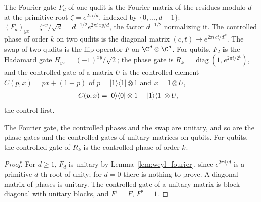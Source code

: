 \begin{definition}[Gates]
    \label{def:qft_gates}
    \leanok
    The Fourier gate $F_d$ of one qudit is the Fourier matrix of the residues modulo $d$ at
    the primitive root $\zeta=e^{2\pi i/d}$, indexed by $\{0,\dots,d-1\}$:
    $(F_d)_{yx}=\zeta^{xy}/\sqrt d=d^{-1/2}e^{2\pi i\,xy/d}$, the factor $d^{-1/2}$
    normalizing it. The controlled phase of order $k$ on two qudits is the diagonal
    matrix $(c,t)\mapsto e^{2\pi i\,ct/d^k}$. The swap of two qudits is the flip operator $F$
    on $\C^d\otimes\C^d$. For qubits, $F_2$ is the Hadamard gate
    $H_{yx}=(-1)^{xy}/\sqrt2$; the phase gate is
    $R_k=\operatorname{diag}(1,e^{2\pi i/2^k})$, and the controlled gate of a matrix $U$
    is the controlled element $C(p,x)=px+(1-p)$ of $p=\lvert1\rangle\langle1\rvert\otimes1$
    and $x=1\otimes U$,
    \begin{align}
        C(p,x)&=\lvert0\rangle\langle0\rvert\otimes1+\lvert1\rangle\langle1\rvert\otimes U,
        \notag
    \end{align}
    the control first.
\end{definition}

\begin{lemma}
    \label{lem:qft_gates_unitary}
    \leanok
    The Fourier gate, the controlled phases and the swap are unitary, and so are the
    phase gates and the controlled gates of unitary matrices on qubits. For qubits, the
    controlled gate of $R_k$ is the controlled phase of order $k$.
\end{lemma}
\begin{proof}\leanok
    For $d\geq1$, $F_d$ is unitary by Lemma~\ref{lem:weyl_fourier}, since $e^{2\pi i/d}$ is a
    primitive $d$-th root of unity; for $d=0$ there is nothing to prove. A diagonal matrix of phases is unitary.
    The controlled gate of a unitary matrix is block diagonal with unitary blocks, and
    $F^\dagger=F$, $F^2=1$.
\end{proof}

